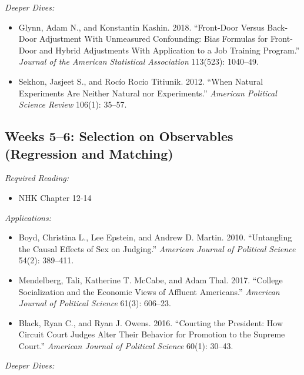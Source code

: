 \documentclass[11pt, letterpaper]{article}
\begin{document}
\noindent \textit{Deeper Dives:}

\begin{itemize}
	\item Glynn, Adam N., and Konstantin Kashin. 2018. ``Front-Door Versus Back-Door Adjustment With Unmeasured Confounding: Bias Formulas for Front-Door and Hybrid Adjustments With Application to a Job Training Program.'' \textit{Journal of the American Statistical Association} 113(523): 1040–49.
	\item Sekhon, Jasjeet S., and Rocío Rocio Titiunik. 2012. ``When Natural Experiments Are Neither Natural nor Experiments.'' \textit{American Political Science Review} 106(1): 35–57.
\end{itemize}

\subsection*{Weeks 5--6: Selection on Observables (Regression and Matching)}

\textit{Required Reading:}

\begin{itemize}
	\item NHK Chapter 12-14
\end{itemize}

\noindent \textit{Applications:}

\begin{itemize}
	\item Boyd, Christina L., Lee Epstein, and Andrew D. Martin. 2010. ``Untangling the Causal Effects of Sex on Judging.'' \textit{American Journal of Political Science} 54(2): 389–411.
	\item Mendelberg, Tali, Katherine T. McCabe, and Adam Thal. 2017. ``College Socialization and the Economic Views of Affluent Americans.'' \textit{American Journal of Political Science} 61(3): 606–23.
	\item Black, Ryan C., and Ryan J. Owens. 2016. “Courting the President: How Circuit Court Judges Alter Their Behavior for Promotion to the Supreme Court.” \textit{American Journal of Political Science} 60(1): 30–43.
\end{itemize}


\noindent \textit{Deeper Dives:}
\end{document}
